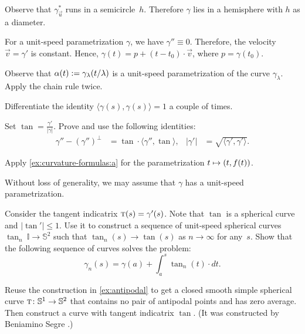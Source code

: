 \begin{multicols}{2}
Observe that $\gamma^*_{\vec u}$ runs in a semicircle~$h$.
Therefore $\gamma$ lies in a hemisphere with $h$ as a diameter.


\setcounter{eqtn}{0}


For a unit-speed parametrization $\gamma$, we have $\gamma''\equiv 0$.
Therefore, the velocity $\vec v=\gamma'$ is constant.
Hence, $\gamma(t)=p+(t-t_0)\cdot \vec v$, where $p=\gamma(t_0)$.


Observe that $\alpha(t)\mathrel{:=}\gamma_{\lambda}(t/\lambda)$ is a unit-speed parametrization of the curve $ \gamma_{\lambda}$.
Apply the chain rule twice.


 Differentiate the identity $\langle\gamma(s),\gamma(s)\rangle=1$ a couple of times.

Set $\tan=\tfrac{\gamma'}{|\gamma|}$.
Prove and use the following identities: 
\begin{align*}
\gamma''-(\gamma'')^\perp&=\tan\cdot\langle\gamma'',\tan\rangle,
&
|\gamma'|&=\sqrt{\langle \gamma',\gamma'\rangle}.
\end{align*}

Apply \ref{ex:curvature-formulas:a} for the parametrization $t\z\mapsto (t,f(t))$.

Without loss of generality, we may assume that $\gamma$ has a unit-speed parametrization.

Consider the tangent indicatrix $\tan(s)\z=\gamma'(s)$.
Note that $\tan$ is a spherical curve and $|\tan'|\le 1$.
Use it to construct a sequence of unit-speed spherical curves $\tan_n\:\mathbb{I}\to\mathbb{S}^2$ such that $\tan_n(s)\to \tan(s)$ as $n\to\infty$ for any~$s$.
Show that the following sequence of curves solves the problem:
\[\gamma_n(s)=\gamma(a)+\int_a^s\tan_n(t)\cdot dt.\]

Reuse the construction in \ref{ex:antipodal} to get a closed smooth simple spherical curve $\tan\:\mathbb{S}^1\z\to\mathbb{S}^2$ that contains no pair of antipodal points and has zero average.
Then construct a curve with tangent indicatrix $\tan$.
(It was constructed by Beniamino Segre \cite{segre}.)


\end{multicols}
